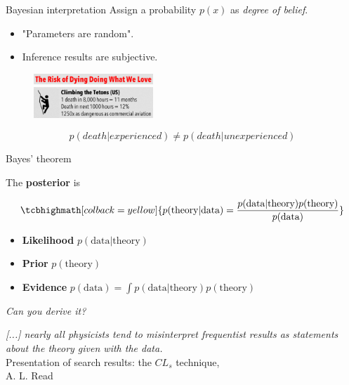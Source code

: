 \documentclass[
aspectratio=169,
14pt,
professionalfonts
]{beamer}
\begin{document}
\begin{frame}{Bayesian interpretation}
    Assign a probability $p(x)$ as \textit{degree of belief}.
    \begin{itemize}
        \item "Parameters are random".
        \item Inference results are subjective.
    \end{itemize}
        \begin{figure}
            \centering
            \includegraphics[width=0.4\textwidth]{../plots/die-title.png}\\
            \includegraphics[width=0.4\textwidth]{../plots/die-climbing.png}
        \end{figure}
        $$p(death|experienced) \neq p(death|unexperienced)$$
\end{frame}

\begin{frame}{Bayes' theorem}

The \textbf{posterior} is

$$
\tcbhighmath[colback=yellow]{
p(\text{theory} | \text{data}) = \frac{p(\text{data}|\text{theory}) p(\text{theory})}{p(\text{data})}
}
$$

\begin{itemize}
    \item \textbf{Likelihood} $p(\text{data}|\text{theory})$
    \item \textbf{Prior} $p(\text{theory})$
    \item \textbf{Evidence} $p(\text{data}) = \int p(\text{data}|\text{theory}) p(\text{theory})$
\end{itemize}
\begin{flushright}
    \textit{Can you derive it?}
\end{flushright}
\end{frame}

\begin{frame}
    \textit{ [...] nearly all physicists tend to misinterpret frequentist results as statements about the theory given with the data.}\\
    \flushright Presentation of search results: the $CL_s$ technique,\\ A. L. Read
\end{frame}
\end{document}
